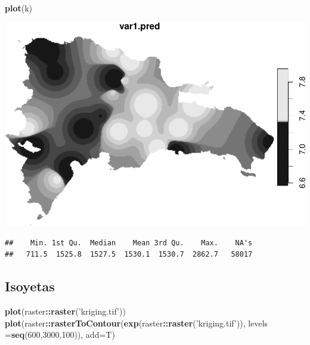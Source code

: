 \documentclass[11pt,]{article}
\newenvironment{Shaded}{\begin{snugshade}}{\end{snugshade}}
\newcommand{\KeywordTok}[1]{\textcolor[rgb]{0.13,0.29,0.53}{\textbf{#1}}}
\newcommand{\DataTypeTok}[1]{\textcolor[rgb]{0.13,0.29,0.53}{#1}}
\newcommand{\DecValTok}[1]{\textcolor[rgb]{0.00,0.00,0.81}{#1}}
\newcommand{\StringTok}[1]{\textcolor[rgb]{0.31,0.60,0.02}{#1}}
\newcommand{\OperatorTok}[1]{\textcolor[rgb]{0.81,0.36,0.00}{\textbf{#1}}}
\newcommand{\NormalTok}[1]{#1}
\begin{document}
\begin{Shaded}
\begin{Highlighting}[]
\KeywordTok{plot}\NormalTok{(k)}
\end{Highlighting}
\end{Shaded}

\includegraphics{proyecto_Superficie_Continua_files/figure-latex/unnamed-chunk-10-1.pdf}

\begin{Shaded}
\end{Shaded}

\begin{verbatim}
##    Min. 1st Qu.  Median    Mean 3rd Qu.    Max.    NA's 
##   711.5  1525.8  1527.5  1530.1  1530.7  2862.7   58017
\end{verbatim}

\subsection{Isoyetas}\label{isoyetas}

\begin{Shaded}
\begin{Highlighting}[]
\KeywordTok{plot}\NormalTok{(raster}\OperatorTok{::}\KeywordTok{raster}\NormalTok{(}\StringTok{'kriging.tif'}\NormalTok{))}
\KeywordTok{plot}\NormalTok{(raster}\OperatorTok{::}\KeywordTok{rasterToContour}\NormalTok{(}\KeywordTok{exp}\NormalTok{(raster}\OperatorTok{::}\KeywordTok{raster}\NormalTok{(}\StringTok{'kriging.tif'}\NormalTok{)), }\DataTypeTok{levels =}\KeywordTok{seq}\NormalTok{(}\DecValTok{600}\NormalTok{,}\DecValTok{3000}\NormalTok{,}\DecValTok{100}\NormalTok{)), }\DataTypeTok{add=}\NormalTok{T)}
\end{Highlighting}
\end{Shaded}
\end{document}
